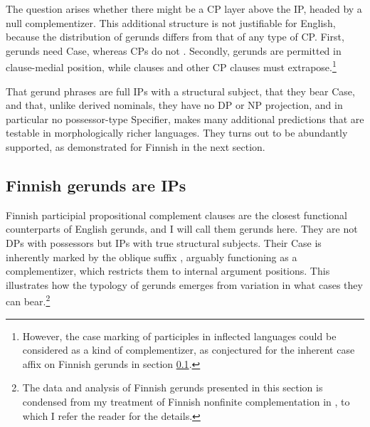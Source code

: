 \documentclass[output=paper,
modfonts
]{LSP/langsci}
\begin{document}
The question arises whether there might be a CP layer above the IP, headed by a null
complementizer.  This additional structure is not justifiable for English, because the
distribution of gerunds differs from that of any type of CP.  First, gerunds need Case, whereas
CPs do not \citep{vergnaud1977}.  Secondly, gerunds are permitted in clause-medial position, while
clauses and other CP clauses must extrapose.\footnote{However, the case marking
  of participles in inflected languages could be considered as a kind of complementizer, as
  conjectured for the inherent case affix  on Finnish gerunds in section
  \ref{finnsection}.}

That gerund phrases are full IPs with a structural subject, that they bear Case, and that,
unlike derived nominals, they have no DP or NP projection, and in particular no possessor-type
Specifier, makes many additional predictions that are testable in morphologically richer
languages.  They turns out to be abundantly supported, as demonstrated for Finnish in the next
section.

\subsection{Finnish gerunds are IPs}
\label{finnsection}
Finnish participial propositional complement clauses are the closest functional counterparts of
English gerunds, and I will call them gerunds here.  They are not DPs with possessors but IPs
with true structural subjects.  Their Case is inherently marked by the oblique suffix ,
arguably functioning as a complementizer, which restricts them to internal argument
positions.  This illustrates how the typology of gerunds emerges from variation in what cases
they can bear.\footnote{The data and analysis of Finnish gerunds presented in this section is
  condensed from my treatment of Finnish nonfinite complementation in \citet{kiparskyInPress}, to
  which I refer the reader for the details.}
\end{document}
